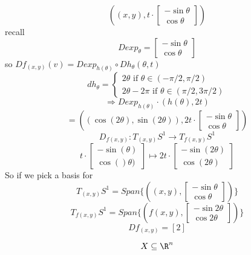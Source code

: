 \begin{example}
$$      \left((x,y), t \cdot
      \begin{bmatrix}
      -\sin \theta \\
      \cos \theta
      \end{bmatrix}\right)
      $$
      recall $$
      Dexp_{\theta}=\begin{bmatrix}
        -\sin \theta \\
        \cos \theta
      \end{bmatrix}
      $$
      so $Df_{(x,y)}(v)=Dexp_{h(\theta)}\circ Dh_{\theta}(\theta,t)$
        $$dh_{\theta}=
        \begin{cases}
          2\theta \text{  if }\theta \in (-\pi/2,\pi/2) \\
          2\theta -2\pi \text{  if }\theta \in (\pi/2,3\pi/2)
        \end{cases}$$
      $$\Rightarrow Dexp_{h(\theta)} \cdot \left(h(\theta),2t\right)$$
      $$=\left((\cos(2\theta),\sin(2\theta)),2t \cdot
      \begin{bmatrix}
        -\sin \theta \\
        \cos \theta
      \end{bmatrix}
      \right)$$
    $$D_{f(x,y)}:T_{(x,y)}S^1 \to T_{f(x,y)}S^1$$
    $$t\cdot
    \begin{bmatrix}
      -\sin (\theta) \\
      \cos ()\theta)
    \end{bmatrix}
    \longmapsto
    2t \cdot
    \begin{bmatrix}
      -\sin (2\theta) \\
      \cos (2\theta)
    \end{bmatrix}
    $$
     So if we pick a basis for
        $$T_{(x,y)}S^1=Span\{\left((x,y),
        \begin{bmatrix}
          -\sin \theta \\
          \cos \theta
        \end{bmatrix}
        \right)\}$$
        $$T_{f(x,y)}S^1=Span\{\left(f(x,y),
        \begin{bmatrix}
          -\sin 2\theta \\
          \cos 2\theta
        \end{bmatrix}
        \right)\}$$
        $$Df_{(x,y)}=[2]$$
\end{example}
$$X \subseteq \R^n $$
